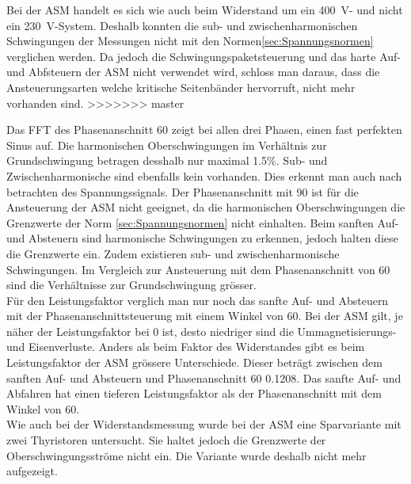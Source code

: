 Bei der ASM handelt es sich wie auch beim Widerstand um ein \SI{400}{V}- und nicht ein \SI{230}{V}-System. Deshalb konnten die sub- und zwischenharmonischen Schwingungen der Messungen nicht mit den Normen\ref{sec:Spannungsnormen} verglichen werden.
Da jedoch die Schwingungspaketsteuerung und das harte Auf- und Abfsteuern der ASM nicht verwendet wird, schloss man daraus, dass die Ansteuerungsarten welche kritische Seitenbänder hervorruft, nicht mehr vorhanden sind. 
>>>>>>> master

Das FFT des Phasenanschnitt 60\textdegree \hspace{0.02cm} zeigt bei allen drei Phasen, einen fast perfekten Sinus auf.
Die harmonischen Oberschwingungen im Verhältnis zur Grundschwingung betragen desshalb nur maximal 1.5\%. Sub- und Zwischenharmonische sind ebenfalls kein vorhanden. Dies erkennt man auch nach betrachten des Spannungssignals.
Der Phasenanschnitt mit 90\textdegree \hspace{0.02cm} ist für die Ansteuerung der ASM nicht geeignet, da die harmonischen Oberschwingungen die Grenzwerte der Norm \ref{sec:Spannungsnormen} nicht einhalten. 
Beim sanften Auf- und Absteuern sind harmonische Schwingungen zu erkennen, jedoch halten diese die Grenzwerte ein. Zudem existieren sub- und zwischenharmonische Schwingungen. Im Vergleich zur Ansteuerung mit dem Phasenanschnitt von 60\textdegree \hspace{0.02cm} sind die Verhältnisse zur Grundschwingung grösser.\\ 

Für den Leistungsfaktor verglich man nur noch das sanfte Auf- und Absteuern mit der Phasenanschnittsteuerung mit einem Winkel von 60\textdegree \hspace{0.02cm}. Bei der ASM gilt, je näher der Leistungsfaktor bei 0 ist, desto niedriger sind die Ummagnetisierungs- und Eisenverluste. Anders als beim Faktor des Widerstandes gibt es beim Leistungsfaktor der ASM grössere Unterschiede. Dieser beträgt zwischen dem sanften Auf- und Absteuern und Phasenanschnitt 60\textdegree \hspace{0.02cm} 0.1208. Das sanfte Auf- und Abfahren hat einen tieferen Leistungsfaktor als der Phasenanschnitt mit dem Winkel von 60\textdegree. \\

Wie auch bei der Widerstandsmessung wurde bei der ASM eine Sparvariante mit zwei Thyristoren untersucht. Sie haltet jedoch die Grenzwerte der Oberschwingungsströme nicht ein. Die Variante wurde deshalb nicht mehr aufgezeigt.\\

